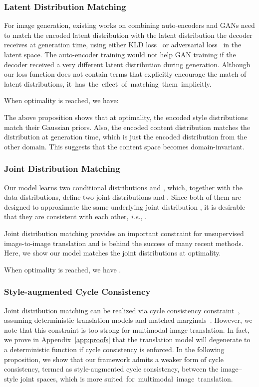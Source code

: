 \documentclass[runningheads]{llncs}
\begin{document}
	\subsubsection{Latent Distribution Matching} For image generation, existing works on combining auto-encoders and GANs need to match the encoded latent distribution with the latent distribution the decoder receives at generation time, using either KLD loss~\cite{liu2017unsupervised,larsen2016autoencoding} or adversarial loss~\cite{royer2017xgan,rosca2017variational} in the latent space. The auto-encoder training would not help GAN training if the decoder received a very different latent distribution during generation. Although our loss function does not contain terms that explicitly encourage the match of latent distributions, \mbox{it has the effect of matching them implicitly.}
	\begin{proposition}
		When optimality is reached, we have:
		\label{proposition:2}
				
	\end{proposition}
	The above proposition shows that at optimality, the encoded style distributions match their Gaussian priors. Also, the encoded content distribution matches the distribution at generation time, which is just the encoded distribution from the other domain. This suggests that the content space becomes domain-invariant.

	\subsubsection{Joint Distribution Matching} Our model learns two conditional distributions  and , which, together with the data distributions, define two joint distributions  and  . Since both of them are designed to approximate the same underlying joint distribution , it is desirable that they are consistent with each other, \textit{i.e.}, .
	
	Joint distribution matching provides an important constraint for unsupervised image-to-image translation and is behind the success of many recent methods. Here, we show our model matches the joint distributions at optimality.
	\begin{proposition}
		When optimality is reached,  we have
		.
	\end{proposition}
	
	\subsubsection{Style-augmented Cycle Consistency} Joint distribution matching can be realized via cycle consistency constraint~\cite{zhu2017unpaired}, assuming deterministic translation models and matched marginals~\cite{li2017alice,donahue2017adversarial,dumoulin2017adversarially}. However, we note that this constraint is too strong for multimodal image translation. In fact, we prove in Appendix~\ref{app:proofs} that the translation model will degenerate to a deterministic function if cycle consistency is enforced. In the following proposition, we show that our framework admits a weaker form of cycle consistency, termed as style-augmented cycle consistency, between the image--style joint spaces, which is more \mbox{suited for multimodal image translation.}
	
\end{document}
